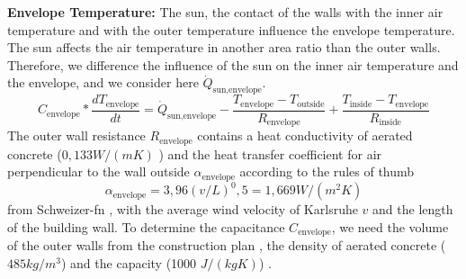     \textbf{Envelope Temperature:}\newline
    The sun, the contact of the walls with the inner air temperature and with the outer temperature influence the envelope temperature. The sun affects the air temperature in another area ratio than the outer walls. Therefore, we difference the influence of the sun on the inner air temperature and the envelope, and we consider here $\dot{Q}_\text{sun,envelope}$.  
    \begin{equation}
        C_\text{envelope}*\frac{d T_\text{envelope}}{d t} = \dot{Q}_\text{sun,envelope} - \frac{T_\text{envelope}-T_\text{outside}}{R_\text{envelope}} + \frac{T_\text{inside}-T_\text{envelope}}{R_\text{inside}}
    \end{equation}
    The outer wall resistance $R_\text{envelope}$ contains a heat conductivity of aerated concrete ($0,133 W/(m K)$ \cite{GhaziWakili.2015}) and the heat transfer coefficient for air perpendicular to the wall outside $\alpha_\text{envelope}$ according to the rules of thumb 
    \begin{equation}
        \alpha_\text{envelope} = 3,96 (v / L)^0,5 = 1,669 W/(m^2 K)
    \end{equation} from Schweizer-fn \cite{Schweizer-fnalpha}, with the average wind velocity of Karlsruhe $v$ \cite{AbteilungKlimaundUmweltberatung.2004} and the length of the building wall.
    To determine the capacitance $C_\text{envelope}$, we need the volume of the outer walls from the construction plan \cite{Bauplan}, the density of aerated concrete ($485 kg/m^3$) and the capacity (1000 $J/(kg K)$) \cite{GhaziWakili.2015}.\newline  
   
